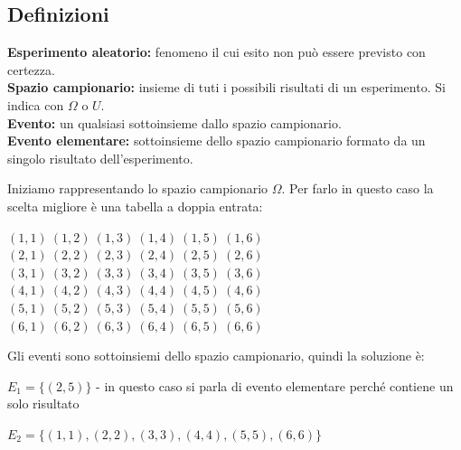 \documentclass{article}     %
\begin{document}
        \subsection{Definizioni}
            \textbf{Esperimento aleatorio:} fenomeno il cui esito non può essere previsto con certezza.\\
            \textbf{Spazio campionario:} insieme di tuti i possibili risultati di un esperimento. Si indica con $\Omega$ o $U$.\\
            \textbf{Evento:} un qualsiasi sottoinsieme dallo spazio campionario.\\
            \textbf{Evento elementare:} sottoinsieme dello spazio campionario formato da un singolo risultato   dell'esperimento.
            \begin{ex}
                [Si lancia un dado a sei facce due volte, rappresentare lo spazio campionario e individuare i seguenti eventi: $E_1=$"sul primo dado esce 2 e sul secondo esce 5" e $E_2=$"escono due numeri uguali."]

            Iniziamo rappresentando lo spazio campionario $\Omega$. Per farlo in questo caso la scelta migliore è una tabella a doppia entrata:
            \begin{center}
                \((1,1)~(1,2)~(1,3)~(1,4)~(1,5)~(1,6)\)\\
                \((2,1)~(2,2)~(2,3)~(2,4)~(2,5)~(2,6)\)\\
                \((3,1)~(3,2)~(3,3)~(3,4)~(3,5)~(3,6)\)\\
                \((4,1)~(4,2)~(4,3)~(4,4)~(4,5)~(4,6)\)\\
                \((5,1)~(5,2)~(5,3)~(5,4)~(5,5)~(5,6)\)\\
                \((6,1)~(6,2)~(6,3)~(6,4)~(6,5)~(6,6)\)\\
            \end{center}

            Gli eventi sono sottoinsiemi dello spazio campionario, quindi la soluzione è:

            $E_1=\{(2,5)\}$ - in questo caso si parla di evento elementare perché contiene un solo risultato

            $E_2=\{(1,1), (2,2), (3,3), (4,4), (5,5), (6,6)\}$
        \end{ex} 
\end{document}
